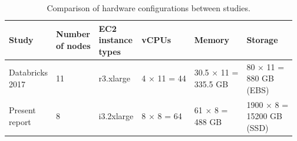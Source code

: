 \begin{table}
  \centering
	\begin{tabular}{|l|l|l|l|l|l|}
	  \hline
		\textbf{Study} & \makecell[l]{\bf Number \\ \bf of nodes} & \makecell[l]{\bf EC2 \\ \bf instance \\ \bf types} & \textbf{vCPUs} & \textbf{Memory} & \textbf{Storage} \\ \hline
		\makecell[l]{Databricks \\ 2017} & 11 & r3.xlarge & 4 × 11 = 44 & \makecell[l]{30.5 × 11 = \\ 335.5 GB} & \makecell[l]{80 × 11 = \\ 880 GB \\ (EBS)} \\ \hline
		\makecell[l]{Present \\ report} & 8 & i3.2xlarge & 8 × 8 = 64 & \makecell[l]{61 × 8 = \\ 488 GB} & \makecell[l]{1900 × 8 = \\ 15200 GB \\ (SSD)} \\ \hline
	\end{tabular}
	\caption{Comparison of hardware configurations between studies.}
	\label{table:comparisonStudiesConfigurations}
\end{table}




